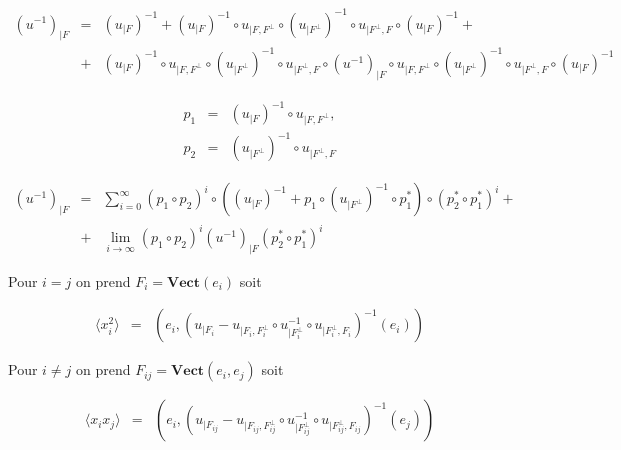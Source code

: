 \begin{aff}
\begin{eqnarray*}
	\left (u^{-1} \right )_{\vert F} & = & 	 \left (u_{\vert F }\right )^{-1}  +  \left (u_{\vert F }\right )^{-1} \circ u_{\vert F , F^\perp }\circ  \left ( u_{\vert F^\perp } \right)^{-1} \circ u_{\vert F^\perp , F } \circ  \left (u_{\vert F }\right )^{-1} + \\
	& + & \left (u_{\vert F }\right )^{-1} \circ u_{\vert F , F^\perp }\circ \left (u_{\vert F^\perp }\right )^{-1} \circ u_{\vert F ^\perp, F }\circ \left (u^{-1} \right )_{\vert F} \circ u_{\vert F, F ^\perp } \circ \left (u_{\vert F^\perp }\right )^{-1} \circ  u_{\vert F ^\perp, F } \circ \left (u_{\vert F }\right )^{-1}
\end{eqnarray*}

\begin{eqnarray*}
	p_1 & = & 	\left (u_{\vert F }\right )^{-1} \circ u_{\vert F , F^\perp } , \\
	p_2 & = & \left (u_{\vert F^\perp }\right )^{-1} \circ u_{\vert F ^\perp, F }
\end{eqnarray*}

\begin{eqnarray*}
	\left (u^{-1} \right )_{\vert F}  & = & \sum_{i = 0 }^\infty (p_	1 \circ p_2)^i \circ \left ( \left (u_{\vert F }\right )^{-1} + p_1 \circ \left ( u_{\vert F^\perp } \right)^{-1}  \circ p_1^\ast \right ) \circ	(p_	2^\ast \circ p_1^\ast )^i + \\
	&+ & \underset{i \to \infty}{\lim}  (p_	1 \circ p_2)^i \left (u^{-1} \right )_{\vert F} (p_2^\ast \circ p_1^\ast )^i
\end{eqnarray*}


	
\end{aff}



Pour $i = j$ on prend $F_i = \mathbf{Vect} ( e_i) $ soit 

\begin{eqnarray*}
	\langle x_i^2 \rangle  & = & \left ( e_i , \left ( u_{\vert F_i }- u_{\vert F_i, F_i^\perp} \circ u_{\vert F_i^\perp}^{-1} \circ u_{\vert F_i^\perp, F_i} \right )^{-1} \left (e_i\right ) \right ) 
\end{eqnarray*}

Pour $i \neq j$ on prend $F_{ij} = \mathbf{Vect} ( e_i , e_j) $ soit 

\begin{eqnarray*}
	\langle x_i x_j \rangle  & = & \left ( e_i , \left ( u_{\vert F_{ij} }- u_{\vert F_{ij}, F_{ij}^\perp} \circ u_{\vert F_{ij}^\perp}^{-1} \circ u_{\vert F_{ij}^\perp, F_{ij}} \right )^{-1} \left (e_j\right ) \right ) 
\end{eqnarray*}


